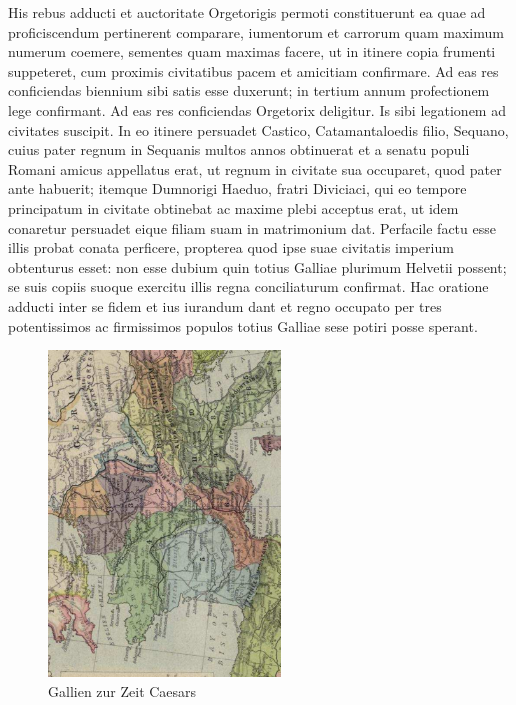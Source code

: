 His rebus adducti et auctoritate Orgetorigis permoti constituerunt
ea quae ad proficiscendum pertinerent comparare, iumentorum et
carrorum quam maximum numerum coemere, sementes quam maximas
facere, ut in itinere copia frumenti suppeteret, cum proximis
civitatibus pacem et amicitiam confirmare. Ad eas res conficiendas
biennium sibi satis esse duxerunt; in tertium annum profectionem
lege confirmant. Ad eas res conficiendas Orgetorix deligitur. Is
sibi legationem ad civitates suscipit. In eo itinere persuadet
Castico, Catamantaloedis filio, Sequano, cuius pater regnum in
Sequanis multos annos obtinuerat et a senatu populi Romani amicus
appellatus erat, ut regnum in civitate sua occuparet, quod pater
ante habuerit; itemque Dumnorigi Haeduo, fratri Diviciaci, qui eo
tempore principatum in civitate obtinebat ac maxime plebi acceptus
erat, ut idem conaretur persuadet eique filiam suam in matrimonium
dat. Perfacile factu esse illis probat conata perficere, propterea
quod ipse suae civitatis imperium obtenturus esset: non esse
dubium quin totius Galliae plurimum Helvetii possent; se suis
copiis suoque exercitu illis regna conciliaturum confirmat. Hac
oratione adducti inter se fidem et ius iurandum dant et regno
occupato per tres potentissimos ac firmissimos populos totius
Galliae sese potiri posse sperant. 


\begin{figure}[htb]
\begin{center}
  \includegraphics[width=175pt, angle=270]{bilder/Galia}
  \caption{Gallien zur Zeit Caesars}\label{fig_Gallien}
\end{center}
\end{figure}


